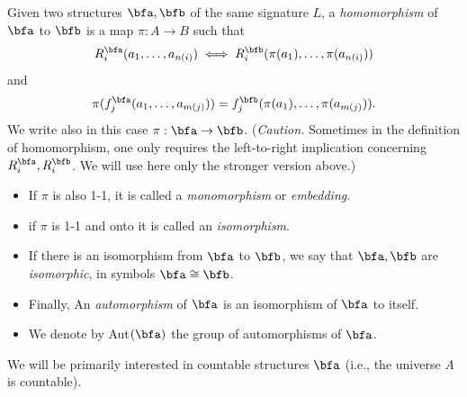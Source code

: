 \begin{definition}
    Given two structures $\bfa ,\bfb$ of the same signature $L$, a {\it
            homomorphism} of $\bfa$ to $\bfb$ is a map $\pi :A\rightarrow B$
    such that
    \[
        R^\bfa_i(a_1,\dots ,a_{n(i)})\iff R^\bfb_i(\pi (a_1),
        \dots ,\pi (a_{n(i)}))
    \]
    and
    \[
        \pi (f^\bfa_j(a_1,\dots ,a_{m(j)}))=f^\bfb_j(\pi (a_1),\dots ,\pi (a_{m(j)}
            )).
    \]
    We write also in this case $\pi :\bfa\rightarrow\bfb$. ({\it Caution.} Sometimes in the definition of homomorphism, one only requires the left-to-right implication concerning $R_i^{\bfa}, R_i^{\bfb}$. We will use here only the stronger version above.)

    \begin{itemize}
        \item If $\pi$ is also 1-1, it is called a {\it monomorphism} or {\it embedding}.
        \item if $\pi$ is 1-1 and onto it is called an {\it isomorphism}.
        \item If there  is an isomorphism from $\bfa$ to $\bfb$, we say that $\bfa ,\bfb$ are {\it isomorphic}, in symbols $\bfa\cong\bfb$.
        \item Finally, An {\it automorphism} of $\bfa$ is an isomorphism of $\bfa$ to itself.
        \item We denote by Aut$(\bfa )$  the group of automorphisms of $\bfa$.

    \end{itemize}

\end{definition}
We will be primarily interested in countable structures $\bfa$ (i.e., the
universe $A$ is countable).


